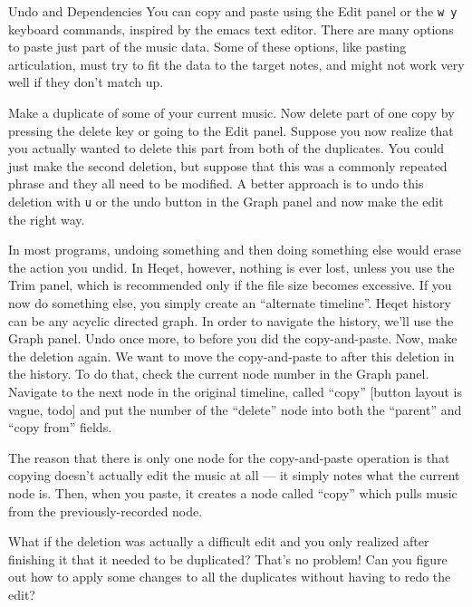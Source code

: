 \documentclass{article}
\begin{document}
\begin{section}{Undo and Dependencies}
You can copy and paste using the Edit panel or the \texttt{w y} keyboard commands, inspired by the emacs text editor. There are many options to paste just part of the music data. Some of these options, like pasting articulation, must try to fit the data to the target notes, and might not work very well if they don't match up. 

Make a duplicate of some of your current music. Now delete part of one copy by pressing the delete key or going to the Edit panel. Suppose you now realize that you actually wanted to delete this part from both of the duplicates. You could just make the second deletion, but suppose that this was a commonly repeated phrase and they all need to be modified. A better approach is to undo this deletion with \texttt{u} or the undo button in the Graph panel and now make the edit the right way. 

In most programs, undoing something and then doing something else would erase the action you undid. In Heqet, however, nothing is ever lost, unless you use the Trim panel, which is recommended only if the file size becomes excessive. If you now do something else, you simply create an ``alternate timeline''. Heqet history can be any acyclic directed graph. In order to navigate the history, we'll use the Graph panel. Undo once more, to before you did the copy-and-paste. Now, make the deletion again. We want to move the copy-and-paste to after this deletion in the history. To do that, check the current node number in the Graph panel. Navigate to the next node in the original timeline, called ``copy'' [button layout is vague, todo] and put the number of the ``delete'' node into both the ``parent'' and ``copy from'' fields.

The reason that there is only one node for the copy-and-paste operation is that copying doesn't actually edit the music at all --- it simply notes what the current node is. Then, when you paste, it creates a node called ``copy'' which pulls music from the previously-recorded node.

What if the deletion was actually a difficult edit and you only realized after finishing it that it needed to be duplicated? That's no problem! Can you figure out how to apply some changes to all the duplicates without having to redo the edit?


\end{section}


\end{document}

